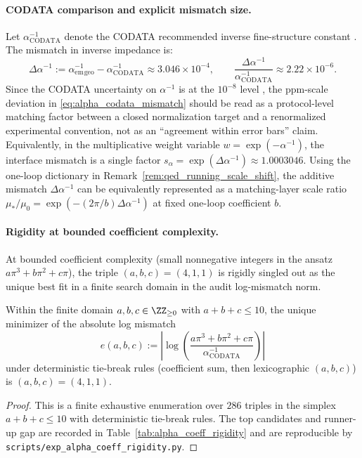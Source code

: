 \paragraph{CODATA comparison and explicit mismatch size.}
Let $\alpha^{-1}_{\mathrm{CODATA}}$ denote the CODATA recommended inverse fine-structure constant \cite{CODATA2022RMP}.
The mismatch in inverse impedance is:
\begin{equation}\label{eq:alpha_codata_mismatch}
\Delta\alpha^{-1}:=\alpha_{\mathrm{em}}^{-1}{}_{\mathrm{geo}}-\alpha_{\mathrm{CODATA}}^{-1}\approx 3.046\times 10^{-4},
\qquad
\frac{\Delta\alpha^{-1}}{\alpha_{\mathrm{CODATA}}^{-1}}\approx 2.22\times 10^{-6}.
\end{equation}
Since the CODATA uncertainty on $\alpha^{-1}$ is at the $10^{-8}$ level \cite{CODATA2022RMP}, the ppm-scale deviation in \eqref{eq:alpha_codata_mismatch} should be read as a protocol-level matching factor between a closed normalization target and a renormalized experimental convention, not as an ``agreement within error bars'' claim.
Equivalently, in the multiplicative weight variable $w=\exp(-\alpha^{-1})$, the interface mismatch is a single factor $s_\alpha=\exp(\Delta\alpha^{-1})\approx 1.0003046$.
Using the one-loop dictionary in Remark~\ref{rem:qed_running_scale_shift}, the additive mismatch $\Delta\alpha^{-1}$ can be equivalently represented as a matching-layer scale ratio $\mu_\ast/\mu_0=\exp(-(2\pi/b)\Delta\alpha^{-1})$ at fixed one-loop coefficient $b$.

\paragraph{Rigidity at bounded coefficient complexity.}
At bounded coefficient complexity (small nonnegative integers in the ansatz $a\pi^3+b\pi^2+c\pi$), the triple $(a,b,c)=(4,1,1)$ is rigidly singled out as the unique best fit in a finite search domain in the audit log-mismatch norm.
\begin{proposition}\label{prop:alpha_coeff_rigidity}
Within the finite domain $a,b,c\in\ZZ_{\ge 0}$ with $a+b+c\le 10$, the unique minimizer of the absolute log mismatch
\[
e(a,b,c):=\left|\log\!\left(\frac{a\pi^3+b\pi^2+c\pi}{\alpha_{\mathrm{CODATA}}^{-1}}\right)\right|
\]
under deterministic tie-break rules (coefficient sum, then lexicographic $(a,b,c)$) is $(a,b,c)=(4,1,1)$.
\end{proposition}
\begin{proof}
This is a finite exhaustive enumeration over $286$ triples in the simplex $a+b+c\le 10$ with deterministic tie-break rules.
The top candidates and runner-up gap are recorded in Table~\ref{tab:alpha_coeff_rigidity} and are reproducible by \texttt{scripts/exp\_alpha\_coeff\_rigidity.py}.
\end{proof}

